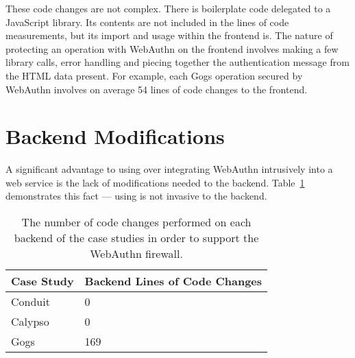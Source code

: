 
These code changes are not complex. There is boilerplate code delegated to a JavaScript library. Its contents are not included in the lines of code measurements, but its import and usage within the frontend is. The nature of protecting an operation with WebAuthn on the frontend involves making a few library calls, error handling and piecing together the authentication message from the HTML data present. For example, each Gogs operation secured by WebAuthn involves on average 54 lines of code changes to the frontend. 




\section{Backend Modifications}\label{Sec:BackendModifications}

A significant advantage to using \sys{} over integrating WebAuthn intrusively into a web service is the lack of modifications needed to the backend. Table~\ref{Table:EvaluationsBackendModifications} demonstrates this fact --- using \sys{} is not invasive to the backend.

\begin{table}[h]
\centering

\begin{tabular}{ m{4.5cm} m{6cm}  } 
 \hline
 Case Study & Backend Lines of Code Changes \\ 
 \hline \hline

 Conduit & 0 \\ \hline

 Calypso & 0 \\ \hline

 Gogs & 169 \\ \hline

\end{tabular}
\caption{The number of code changes performed on each backend of the case studies in order to support the WebAuthn firewall.}
\label{Table:EvaluationsBackendModifications}
\end{table}


